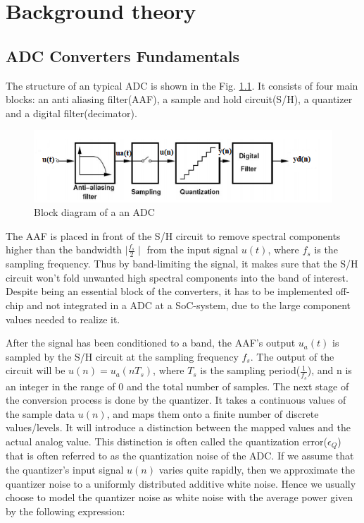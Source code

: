 \chapter{Background theory}\label{Background_theory}

\section{ADC Converters Fundamentals }\label{fundamentals}

The structure of an typical ADC is shown in the Fig. \ref{fig:adc_block}. It consists of four main blocks: an anti aliasing filter(AAF), a sample and hold circuit(S/H), a quantizer and a digital filter(decimator).
\begin{figure}[h]
\centering
\includegraphics[scale=0.9]{images/adc_block.png}
\caption{Block diagram of a an ADC}
\label{fig:adc_block}
\end{figure}

The AAF is placed in front of the S/H circuit to remove spectral components higher than the bandwidth $\mid\frac{f_s}{2}\mid$ from the input signal $u(t)$, where $f_s$ is the sampling frequency. Thus by band-limiting the signal, it makes sure that the S/H circuit won't fold unwanted high spectral components into the band of interest. Despite being an essential block of the converters, it has to be implemented off-chip and not integrated in a ADC at a SoC-system, due to the large component values needed to realize it.  

After the signal has been conditioned to a band, the AAF's output $u_a(t)$ is sampled by the S/H circuit at the sampling frequency $f_s$. The output of the circuit will be $u(n) = u_a(nT_s)$, where $T_s$ is the sampling period($\frac{1}{f_s}$), and n is an integer in the range of 0 and the total number of samples. The next stage of the conversion process is done by the quantizer. It takes a continuous values of the sample data $u(n)$, and maps them onto a finite number of discrete values/levels. It will introduce a distinction between the mapped values and the actual analog value. This distinction is often called the quantization error($\epsilon_Q$) that is often referred to as the quantization noise of the ADC. If we assume that the quantizer's input signal $u(n)$ varies quite rapidly, then we approximate the quantizer noise to a uniformly distributed additive white noise. Hence we usually choose to model the quantizer noise as white noise with the average power given by the following expression: 

